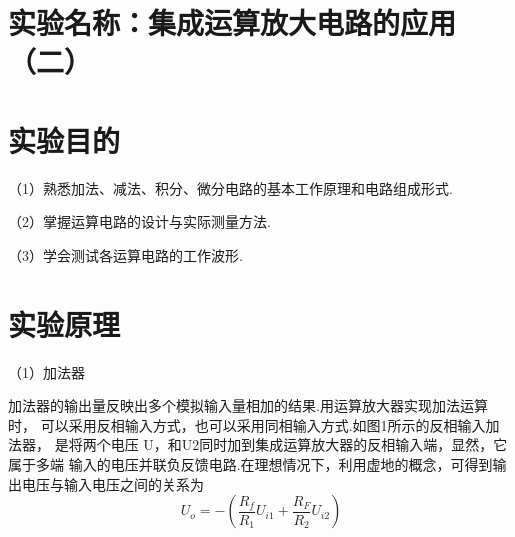 \documentclass{article}
\begin{document}
	\section{ 实验名称：集成运算放大电路的应用（二）}
    \section{ 实验目的}
     （1）熟悉加法、减法、积分、微分电路的基本工作原理和电路组成形式.\par
               （2）掌握运算电路的设计与实际测量方法.\par
               （3）学会测试各运算电路的工作波形. \par
             
			   \section{ 实验原理}
               （1）加法器\par 
               加法器的输出量反映出多个模拟输入量相加的结果.用运算放大器实现加法运算时，
               可以采用反相输入方式，也可以采用同相输入方式.如图1所示的反相输入加法器，
               是将两个电压 U，和U2同时加到集成运算放大器的反相输入端，显然，它属于多端
               输入的电压并联负反馈电路.在理想情况下，利用虚地的概念，可得到输出电压与输入电压之间的关系为
               \begin{equation*}
                \ U_o=-(\frac{R_f}{R_1}U_{i1}+\frac{R_F}{R_2}U_{i2})
               \end{equation*}
              
\end{document}

